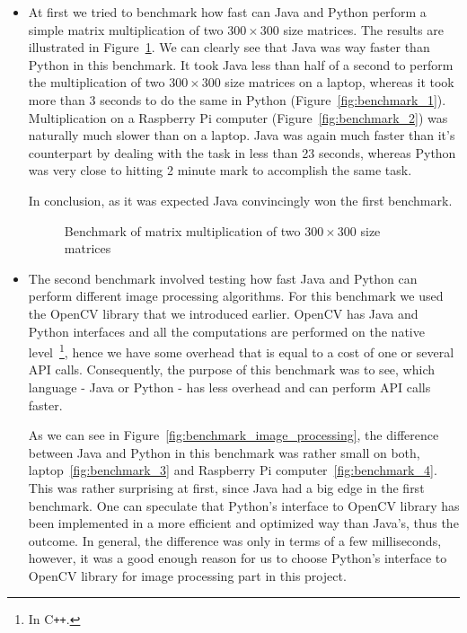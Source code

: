 \begin{itemize}
\item At first we tried to benchmark how fast can Java and Python perform a simple matrix multiplication of two $300 \times 300$ size matrices. The results are illustrated in Figure~\ref{fig:benchmark_multiplication}. We can clearly see that Java was way faster than Python in this benchmark. It took Java less than half of a second to perform the multiplication of two $300 \times 300$ size matrices on a laptop, whereas it took more than 3 seconds to do the same in Python (Figure~\ref{fig:benchmark_1}). Multiplication on a Raspberry Pi computer (Figure~\ref{fig:benchmark_2}) was naturally much slower than on a laptop. Java was again much faster than it's counterpart by dealing with the task in less than 23 seconds, whereas Python was very close to hitting 2 minute mark to accomplish the same task.

In conclusion, as it was expected Java convincingly won the first benchmark.

\begin{figure}[htb]
		\centering
		\quad
		\caption{Benchmark of matrix multiplication of two $300 \times 300$ size matrices}
		\label{fig:benchmark_multiplication}
\end{figure}

\item The second benchmark involved testing how fast Java and Python can perform different image processing algorithms. For this benchmark we used the OpenCV library that we introduced earlier. OpenCV has Java and Python interfaces and all the computations are performed on the native level~\footnote{In C\texttt{++}.}, hence we have some overhead that is equal to a cost of one or several API calls. Consequently, the purpose of this benchmark was to see, which language - Java or Python - has less overhead and can perform API calls faster. 

As we can see in Figure~\ref{fig:benchmark_image_processing}, the difference between Java and Python in this benchmark was rather small on both, laptop~\ref{fig:benchmark_3} and Raspberry Pi computer~\ref{fig:benchmark_4}. This was rather surprising at first, since Java had a big edge in the first benchmark. One can speculate that Python's interface to OpenCV library has been implemented in a more efficient and optimized way than Java's, thus the outcome. In general, the difference was only in terms of a few milliseconds, however, it was a good enough reason for us to choose Python's interface to OpenCV library for image processing part in this project.


\end{itemize}
